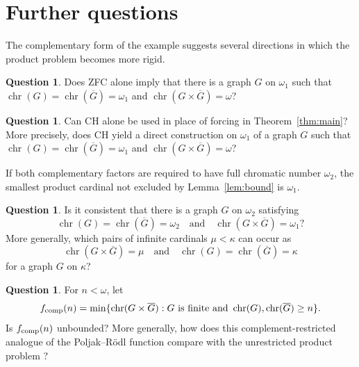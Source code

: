\documentclass{amsart}
\numberwithin{equation}{section}
\theoremstyle{definition}
\newtheorem{question}[theorem]{Question}
\theoremstyle{remark}
\newcommand{\chr}{\operatorname{chr}}
\begin{document}
\iffalse
\section{Further questions}

The complementary form of the example suggests several directions in
which the product problem becomes more rigid.

\begin{question}
Does ZFC alone imply that there is a graph $G$ on $\omega_1$ such that
$\chr(G)=\chr(\overline G)=\omega_1$ and
$\chr(G\times\overline G)=\omega$?
\end{question}

\begin{question}
Can CH alone be used in place of forcing in
Theorem~\ref{thm:main}?  More precisely, does CH yield a direct
construction on $\omega_1$ of a graph $G$ such that
$\chr(G)=\chr(\overline G)=\omega_1$ and
$\chr(G\times\overline G)=\omega$?
\end{question}

If both complementary factors are required to have full chromatic
number $\omega_2$, the smallest product cardinal not excluded by
Lemma~\ref{lem:bound} is $\omega_1$.

\begin{question}\label{q:omega2}
Is it consistent that there is a graph $G$ on $\omega_2$ satisfying
\begin{displaymath}
 \chr(G)=\chr(\overline G)=\omega_2
 \quad\text{and}\quad
 \chr(G\times\overline G)=\omega_1?
\end{displaymath}
More generally, which pairs of infinite cardinals $\mu<\kappa$ can
occur as
\begin{displaymath}
 \chr(G\times\overline G)=\mu
 \quad\text{and}\quad
 \chr(G)=\chr(\overline G)=\kappa
\end{displaymath}
for a graph $G$ on $\kappa$?
\end{question}

\begin{question}
For $n<\omega$, let
\begin{displaymath}
 f_{\rm comp}(n)=
 \min\{\chr(G\times\overline G):G\text{ is finite and }
          \chr(G),\chr(\overline G)\geq n\}.
\end{displaymath}
Is $f_{\rm comp}(n)$ unbounded?  More generally, how does this
complement-restricted analogue of the Poljak--R\"odl function compare
with the unrestricted product problem \cite{PoljakRodl1981}?
\end{question}
\end{document}
